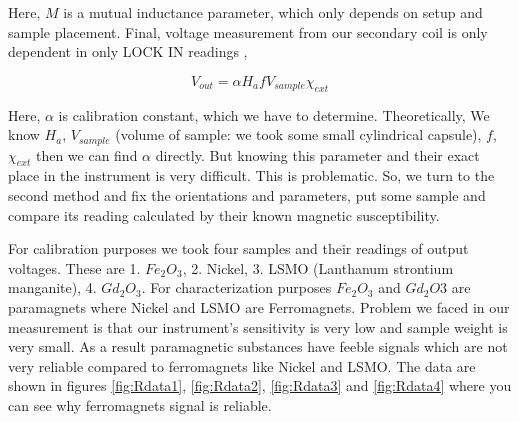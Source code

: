 Here, $M$ is a mutual inductance parameter, which only depends on setup and sample placement. Final, voltage measurement from our secondary coil is only dependent in only LOCK IN readings \cite{cambr},

\begin{equation*}\label{thiseq}
V_{out} = \alpha H_a f V_{sample} \chi_{ext}
\end{equation*}

Here, $\alpha$ is calibration constant, which we have to determine. Theoretically, We know $H_a$, $V_{sample}$ (volume of sample: we took some small cylindrical capsule), $f$, $\chi_{ext}$ then we can find $\alpha$ directly. But knowing this parameter and their exact place in the instrument is very difficult. This is problematic. So, we turn to the second method and fix the orientations and parameters, put some sample and compare its reading calculated by their known magnetic susceptibility. 

For calibration purposes we took four samples and their readings of output voltages. These are 1. $Fe_2O_3$, 2. Nickel, 3. LSMO (Lanthanum strontium manganite), 4. $Gd_2O_3$. For characterization purposes $Fe_2O_3$ and $Gd_2O3$ are paramagnets where Nickel and LSMO are Ferromagnets. Problem we faced in our measurement is that our instrument’s sensitivity is very low and sample weight is very small. As a result paramagnetic substances have feeble signals which are not very reliable compared to ferromagnets like Nickel and LSMO. The data are shown in figures \ref{fig:Rdata1}, \ref{fig:Rdata2}, \ref{fig:Rdata3} and \ref{fig:Rdata4} where you can see why ferromagnets signal is reliable.

